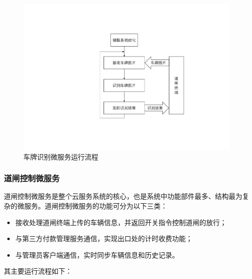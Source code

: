 \documentclass[a4paper]{ctexart}
\begin{document}
\begin{figure}[htbp]
	\centering
	\includegraphics[width=\textwidth]{figure/server-python.pdf}
	\caption{车牌识别微服务运行流程}\label{fig:车牌识别微服务运行流程}
\end{figure}

\subsubsection{道闸控制微服务}\label{道闸控制微服务}
道闸控制微服务是整个云服务系统的核心，也是系统中功能部件最多、结构最为复杂的微服务。道闸控制微服务的功能可分为以下三类：
\begin{itemize}
	\item 接收处理道闸终端上传的车辆信息，并返回开关指令控制道闸的放行；
	\item 与第三方付款管理服务通信，实现出口处的计时收费功能；
	\item 与管理员客户端通信，实时同步车辆信息和历史记录。
\end{itemize}

其主要运行流程如下：
\end{document}
